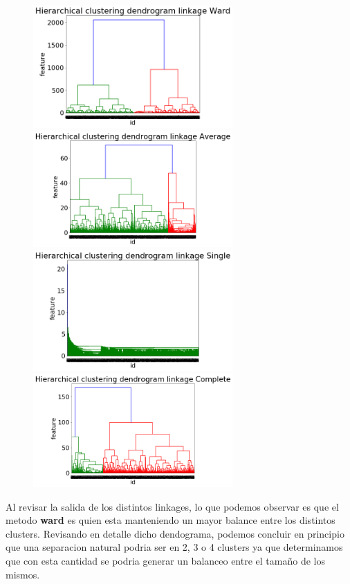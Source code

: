 \begin{figure}[H]
{\includegraphics[width = 3in]{img/imagenes/jerarquico_AF/dendongrama_ward.png}} 
{\includegraphics[width = 3in]{img/imagenes/jerarquico_AF/dendongrama_average.png}}\\
{\includegraphics[width = 3in]{img/imagenes/jerarquico_AF/dendongrama_single.png}}
{\includegraphics[width = 3in]{img/imagenes/jerarquico_AF/dendongrama_complete.png}} 
\label{Comparativa entre linkage criterions}
\end{figure}

Al revisar la salida de los distintos linkages, lo que podemos observar es que el metodo \textbf{ward} es quien esta manteniendo un mayor balance entre los distintos clusters. Revisando en detalle dicho dendograma, podemos concluir en principio que una separacion natural podria ser en 2, 3 o 4 clusters ya que determinamos que con esta cantidad se podria generar un balanceo entre el tamaño de los mismos.

